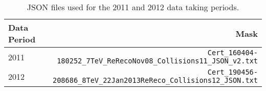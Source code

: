 \begin{table}[hbth]
\centering
\begin{tabular}{lr}
\hline
\textbf{Data Period} & \textbf{Mask} \\
\hline
2011 & \verb|Cert_160404-180252_7TeV_ReRecoNov08_Collisions11_JSON_v2.txt| \\
2012 & \verb|Cert_190456-208686_8TeV_22Jan2013ReReco_Collisions12_JSON.txt| \\
\hline
\end{tabular}
\caption{JSON files used for the 2011 and 2012 data taking periods.}
\label{tab:JSONfiles}
\end{table}
 
